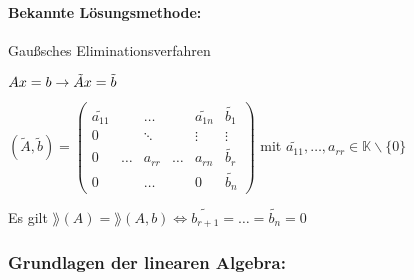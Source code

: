 \paragraph{Bekannte Lösungsmethode:} Gaußsches Eliminationsverfahren

$Ax=b \rightarrow \tilde{A}x= \tilde{b} \\$

$(\tilde{A},\tilde{b})=
\begin{pmatrix}
\widetilde{a_{11}} & &\dots  &  & \widetilde{a_{1n}} & \widetilde{b_1} \\
0 & & \ddots &  & \vdots & \vdots \\
0 & \dots & a_{rr} & \dots & a_{rn} & \widetilde{b_r} \\
0 & & \dots & & 0 & \widetilde{b_n} \end{pmatrix} $
mit $\widetilde{a_{11}}, \dots, a_{rr} \in \mathbb{K} \backslash \{0\} $

Es gilt $\rang(A)= \rang (A,b) \Leftrightarrow
\widetilde{b_{r+1}} = \dots = \widetilde{b_n} = 0 $

\subsubsection*{Grundlagen der linearen Algebra:}

